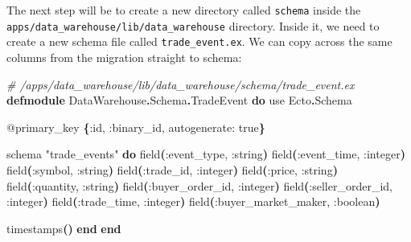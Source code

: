 \documentclass[
  oneside]{book}
\newenvironment{Shaded}{\begin{snugshade}}{\end{snugshade}}
\newcommand{\CommentTok}[1]{\textcolor[rgb]{0.56,0.35,0.01}{\textit{#1}}}
\newcommand{\ConstantTok}[1]{\textcolor[rgb]{0.56,0.35,0.01}{#1}}
\newcommand{\FunctionTok}[1]{\textcolor[rgb]{0.13,0.29,0.53}{\textbf{#1}}}
\newcommand{\ImportTok}[1]{#1}
\newcommand{\KeywordTok}[1]{\textcolor[rgb]{0.13,0.29,0.53}{\textbf{#1}}}
\newcommand{\NormalTok}[1]{#1}
\newcommand{\OperatorTok}[1]{\textcolor[rgb]{0.81,0.36,0.00}{\textbf{#1}}}
\newcommand{\OtherTok}[1]{\textcolor[rgb]{0.56,0.35,0.01}{#1}}
\newcommand{\StringTok}[1]{\textcolor[rgb]{0.31,0.60,0.02}{#1}}
\newcommand{\VariableTok}[1]{\textcolor[rgb]{0.00,0.00,0.00}{#1}}
\begin{document}
\begin{Shaded}
\end{Shaded}

\newpage

The next step will be to create a new directory called \texttt{schema} inside the\\
\texttt{apps/data\_warehouse/lib/data\_warehouse} directory. Inside it, we need to create a new schema file called \texttt{trade\_event.ex}. We can copy across the same columns from the migration straight to schema:

\begin{Shaded}
\begin{Highlighting}[]
\CommentTok{\# /apps/data\_warehouse/lib/data\_warehouse/schema/trade\_event.ex}
\KeywordTok{defmodule} \ConstantTok{DataWarehouse}\OperatorTok{.}\ConstantTok{Schema}\OperatorTok{.}\ConstantTok{TradeEvent} \KeywordTok{do}
  \ImportTok{use} \ConstantTok{Ecto}\OperatorTok{.}\ConstantTok{Schema}

  \OtherTok{@primary\_key} \FunctionTok{\{}\VariableTok{:id}\NormalTok{, }\VariableTok{:binary\_id}\NormalTok{, }\VariableTok{autogenerate:} \ConstantTok{true}\FunctionTok{\}}

\NormalTok{  schema }\StringTok{"trade\_events"} \KeywordTok{do}
\NormalTok{    field}\FunctionTok{(}\VariableTok{:event\_type}\NormalTok{, }\VariableTok{:string}\FunctionTok{)}
\NormalTok{    field}\FunctionTok{(}\VariableTok{:event\_time}\NormalTok{, }\VariableTok{:integer}\FunctionTok{)}
\NormalTok{    field}\FunctionTok{(}\VariableTok{:symbol}\NormalTok{, }\VariableTok{:string}\FunctionTok{)}
\NormalTok{    field}\FunctionTok{(}\VariableTok{:trade\_id}\NormalTok{, }\VariableTok{:integer}\FunctionTok{)}
\NormalTok{    field}\FunctionTok{(}\VariableTok{:price}\NormalTok{, }\VariableTok{:string}\FunctionTok{)}
\NormalTok{    field}\FunctionTok{(}\VariableTok{:quantity}\NormalTok{, }\VariableTok{:string}\FunctionTok{)}
\NormalTok{    field}\FunctionTok{(}\VariableTok{:buyer\_order\_id}\NormalTok{, }\VariableTok{:integer}\FunctionTok{)}
\NormalTok{    field}\FunctionTok{(}\VariableTok{:seller\_order\_id}\NormalTok{, }\VariableTok{:integer}\FunctionTok{)}
\NormalTok{    field}\FunctionTok{(}\VariableTok{:trade\_time}\NormalTok{, }\VariableTok{:integer}\FunctionTok{)}
\NormalTok{    field}\FunctionTok{(}\VariableTok{:buyer\_market\_maker}\NormalTok{, }\VariableTok{:boolean}\FunctionTok{)}

\NormalTok{    timestamps}\FunctionTok{()}
  \KeywordTok{end}
\KeywordTok{end}
\end{Highlighting}
\end{Shaded}
\end{document}
